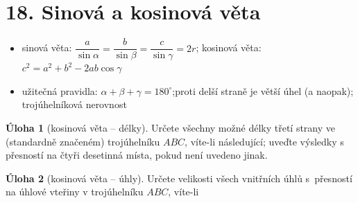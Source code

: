 \documentclass[8pt,a4paper]{extarticle}
\def\tisk{%
\newbox\shipouthackbox
\pdfpagewidth=2\pdfpagewidth
\let\oldshipout=\shipout
\def\shipout{\afterassignment\zdvojtmp \setbox\shipouthackbox=}%
\def\zdvojtmp{\aftergroup\zdvoj}%
\def\zdvoj{%
    \oldshipout\vbox{\hbox{%
        \copy\shipouthackbox
        \hskip\dimexpr .5\pdfpagewidth-\wd\shipouthackbox\relax
        \box\shipouthackbox
    }}%
}}%
\let\results\newpage
\let\endresults\relax
\def\resultssame{%
    \long\def\results##1\endresults{%
        \vfill
        \noindent\rotatebox{180}{\vbox{##1}}%
    }%
}
\theoremstyle{definition}
\newtheorem{uloha}{\atr Úloha}
\let\=\doteq
\let\ee\expandafter
\def\locvysl#1{\ee\gdef\ee\locvysld\ee{\locvysld\item #1}}
\let\lv\locvysl
\newenvironment{ulohav}[1][]{\begin{uloha}[#1]\gdef\locvysld{\begin{enumerate*}}}{\ee\vyslplain\ee{\locvysld\end{enumerate*}}\end{uloha}}
\def\atr{}
\def\st{^\circ}
\begin{document}

\section*{18. Sinová a kosinová věta}

\begin{itemize}[itemsep=\smallskipamount]
\item sinová věta: $\dfrac{a}{\sin \alpha} = \dfrac{b}{\sin \beta} = \dfrac{c}{\sin \gamma} = 2r$;%
\quad
kosinová věta: $c^2 = a^2 + b^2 - 2ab\cos \gamma$
\item užitečná pravidla: $\alpha+\beta+\gamma=180\st$;\quad proti delší straně je větší úhel (a naopak); \quad trojúhelníková nerovnost
\end{itemize}

\begin{multicols}{2}

\begin{ulohav}[kosinová věta -- délky]
Určete všechny možné délky třetí strany ve (standardně značeném) trojúhelníku $ABC$, víte-li následující; uveďte výsledky s přesností na čtyři desetinná místa, pokud není uvedeno jinak.
\end{ulohav}


\begin{ulohav}[kosinová věta -- úhly]
Určete velikosti všech vnitřních úhlů s~přesností na úhlové vteřiny v trojúhelníku $ABC$, víte-li
\end{ulohav}



\end{multicols}
\end{document}
